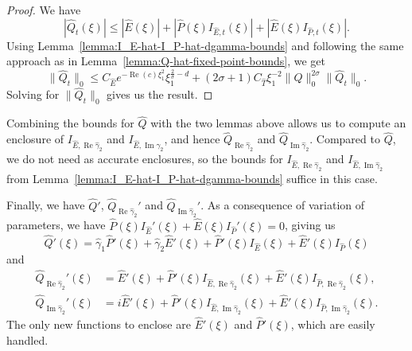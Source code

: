 \documentclass[11pt]{article}
\DeclareMathOperator{\real}{Re}
\DeclareMathOperator{\imag}{Im}
\begin{document}
\begin{proof}
  We have
  \begin{equation*}
    |\hat{Q}_{t}(\xi)| \leq |\hat{E}(\xi)|
    + |\hat{P}(\xi)I_{\hat{E},t}(\xi)|
    + |\hat{E}(\xi)I_{\hat{P},t}(\xi)|.
  \end{equation*}
  Using Lemma~\ref{lemma:I_E-hat-I_P-hat-dgamma-bounds} and following
  the same approach as in Lemma~\ref{lemma:Q-hat-fixed-point-bounds},
  we get
  \begin{equation*}
    \|\hat{Q}_{t}\|_{0}
    \leq C_{\hat{E}}e^{-\real(c)\xi_{1}^{2}}\xi_{1}^{\frac{2}{\sigma} - d}
    + (2\sigma + 1)C_{\hat{T}}\xi_{1}^{-2}\|\hat{Q}\|_{0}^{2\sigma}\|\hat{Q}_{t}\|_{0}.
  \end{equation*}
  Solving for \(\|\hat{Q}_{t}\|_{0}\) gives us the result.
\end{proof}

Combining the bounds for \(\hat{Q}\) with the two lemmas above allows
us to compute an enclosure of \(I_{\hat{E},\real\hat{\gamma}_{2}}\)
and \(I_{\hat{E},\imag\hat{\gamma}_{2}}\), and hence
\(\hat{Q}_{\real\hat{\gamma}_{2}}\) and
\(\hat{Q}_{\imag\hat{\gamma}_{2}}\). Compared to \(\hat{Q}\), we do not
need as accurate enclosures, so the bounds for
\(I_{\hat{E},\real\hat{\gamma}_{2}}\) and
\(I_{\hat{E},\imag\hat{\gamma}_{2}}\) from
Lemma~\ref{lemma:I_E-hat-I_P-hat-dgamma-bounds} suffice in this case.

Finally, we have \(\hat{Q}'\), \(\hat{Q}_{\real\hat{\gamma}_{2}}'\)
and \(\hat{Q}_{\imag\hat{\gamma}_{2}}'\). As a consequence of
variation of parameters, we have
\(\hat{P}(\xi)I_{\hat{E}}'(\xi) + \hat{E}(\xi)I_{\hat{P}}'(\xi) = 0\),
giving us
\begin{equation*}
  \hat{Q}'(\xi)
  = \hat{\gamma}_{1}\hat{P}'(\xi) + \hat{\gamma}_{2}\hat{E}'(\xi)
  + \hat{P}'(\xi)I_{\hat{E}}(\xi) + \hat{E}'(\xi)I_{\hat{P}}(\xi)
\end{equation*}
and
\begin{align*}
  \hat{Q}_{\real\hat{\gamma}_{2}}'(\xi)
  &= \hat{E}'(\xi)
  + \hat{P}'(\xi)I_{\hat{E},\real\hat{\gamma}_{2}}(\xi) + \hat{E}'(\xi)I_{\hat{P},\real\hat{\gamma}_{2}}(\xi),\\
  \hat{Q}_{\imag\hat{\gamma}_{2}}'(\xi)
  &= i\hat{E}'(\xi)
  + \hat{P}'(\xi)I_{\hat{E},\imag\hat{\gamma}_{2}}(\xi) + \hat{E}'(\xi)I_{\hat{P},\imag\hat{\gamma}_{2}}(\xi).
\end{align*}
The only new functions to enclose are \(\hat{E}'(\xi)\) and
\(\hat{P}'(\xi)\), which are easily handled.
\end{document}
